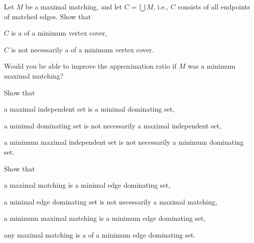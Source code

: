 \begin{ex}\label{ex:mmvc}
    Let $M$ be a maximal matching, and let $C = \bigcup M$, i.e., $C$ consists of all endpoints of matched edges. Show that
    \begin{subex}
        \item $C$ is a  of a minimum vertex cover,
        \item $C$ is not necessarily a  of a minimum vertex cover.
    \end{subex}
    Would you be able to improve the approximation ratio if $M$ was a minimum maximal matching?
\end{ex}

\begin{ex}
    Show that
    \begin{subex}
        \item a maximal independent set is a minimal dominating set,
        \item a minimal dominating set is not necessarily a maximal independent set,
        \item a minimum maximal independent set is not necessarily a minimum dominating set.
    \end{subex}
\end{ex}

\begin{ex}\label{ex:mmeds}
    Show that
    \begin{subex}
        \item a maximal matching is a minimal edge dominating set,
        \item a minimal edge dominating set is not necessarily a maximal matching,
        \item a minimum maximal matching is a minimum edge dominating set,
        \item any maximal matching is a  of a minimum edge dominating set.
    \end{subex}
\end{ex}

